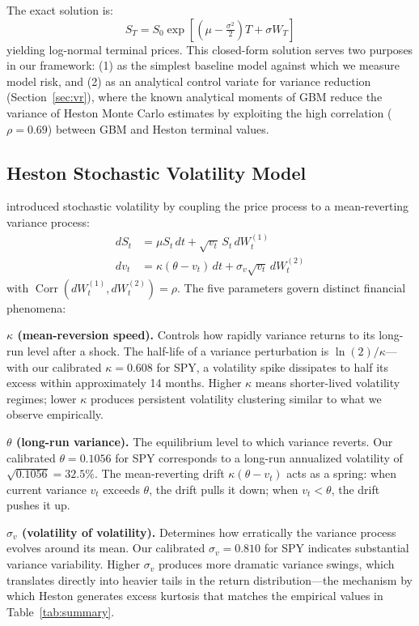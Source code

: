 \documentclass[11pt,a4paper]{article}
\newcommand{\Corr}{\operatorname{Corr}}
\begin{document}
The exact solution is:
\begin{equation}
\label{eq:gbm_solution}
S_T = S_0 \exp\!\left[\left(\mu - \tfrac{\sigma^2}{2}\right)T + \sigma W_T\right]
\end{equation}
yielding log-normal terminal prices.
This closed-form solution serves two purposes in our framework: (1) as the simplest baseline model against which we measure model risk, and (2) as an analytical control variate for variance reduction (Section~\ref{sec:vr}), where the known analytical moments of GBM reduce the variance of Heston Monte Carlo estimates by exploiting the high correlation ($\rho = 0.69$) between GBM and Heston terminal values.

\subsection{Heston Stochastic Volatility Model}
\label{sec:heston}

\citet{heston1993} introduced stochastic volatility by coupling the price process to a mean-reverting variance process:
\begin{align}
\label{eq:heston}
dS_t &= \mu S_t \, dt + \sqrt{v_t} \, S_t \, dW_t^{(1)} \\
dv_t &= \kappa(\theta - v_t) \, dt + \sigma_v \sqrt{v_t} \, dW_t^{(2)} \label{eq:heston_var}
\end{align}
with $\Corr(dW_t^{(1)}, dW_t^{(2)}) = \rho$.
The five parameters govern distinct financial phenomena:

\textbf{$\kappa$ (mean-reversion speed).}
Controls how rapidly variance returns to its long-run level after a shock.
The half-life of a variance perturbation is $\ln(2)/\kappa$---with our calibrated $\kappa = 0.608$ for SPY, a volatility spike dissipates to half its excess within approximately 14 months.
Higher $\kappa$ means shorter-lived volatility regimes; lower $\kappa$ produces persistent volatility clustering similar to what we observe empirically.

\textbf{$\theta$ (long-run variance).}
The equilibrium level to which variance reverts.
Our calibrated $\theta = 0.1056$ for SPY corresponds to a long-run annualized volatility of $\sqrt{0.1056} = 32.5\%$.
The mean-reverting drift $\kappa(\theta - v_t)$ acts as a spring: when current variance $v_t$ exceeds $\theta$, the drift pulls it down; when $v_t < \theta$, the drift pushes it up.

\textbf{$\sigma_v$ (volatility of volatility).}
Determines how erratically the variance process evolves around its mean.
Our calibrated $\sigma_v = 0.810$ for SPY indicates substantial variance variability.
Higher $\sigma_v$ produces more dramatic variance swings, which translates directly into heavier tails in the return distribution---the mechanism by which Heston generates excess kurtosis that matches the empirical values in Table~\ref{tab:summary}.
\end{document}
